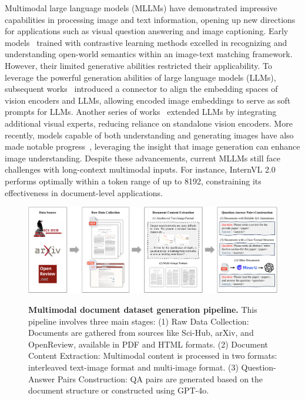 \documentclass[10pt,twocolumn,letterpaper]{article}
\begin{document}
\begin{CJK}{UTF8}{gbsn}
Multimodal large language models (MLLMs) have demonstrated impressive capabilities in processing image and text information, opening up new directions for applications such as visual question answering and image captioning.
Early models~\cite{openclip, rebuffi2017learning, li2022blip, chen2023internvl} trained with contrastive learning methods excelled in recognizing and understanding open-world semantics within an image-text matching framework. However, their limited generative abilities restricted their applicability.
To leverage the powerful generation abilities of large language models (LLMs), subsequent works~\cite{li2023blip2, liu2023llava, chen2024far, wang2023allseeing, wang2024allseeingv2,2023interngpt} introduced a connector to align the embedding spaces of vision encoders and LLMs, allowing encoded image embeddings to serve as soft prompts for LLMs. 
Another series of works~\cite{alayrac2022flamingo,li2024omnicorpus,laurenccon2024obelics,zhu2024mmc4} extended LLMs by integrating additional visual experts, reducing reliance on standalone vision encoders.
More recently, models capable of both understanding and generating images have also made notable progress~\cite{tian2024mminterleaved, dong2023dreamllm, sun2023emu, li2023seed}, leveraging the insight that image generation can enhance image understanding.
Despite these advancements, current MLLMs still face challenges with long-context multimodal inputs. For instance, InternVL 2.0~\cite{chen2024far,gao2024mini_internvl} performs optimally within a token range of up to 8192, constraining its effectiveness in document-level applications.


\begin{figure}[t!]
    \centering
    {\includegraphics[width=\linewidth]{figure/data_engine.pdf}}
    \caption{
    \textbf{Multimodal document dataset generation pipeline.} 
    This pipeline involves three main stages: 
    (1) Raw Data Collection: Documents are gathered from sources like Sci-Hub, arXiv, and OpenReview, available in PDF and HTML formats. 
    (2) Document Content Extraction: Multimodal content is processed in two formats: interleaved text-image format and multi-image format. 
    (3) Question-Answer Pairs Construction: QA pairs are generated based on the document structure or constructed using GPT-4o.
    }
    \label{fig:data_pipeline}
    \vspace{-2mm}
\end{figure}



\end{CJK}
\end{document}
